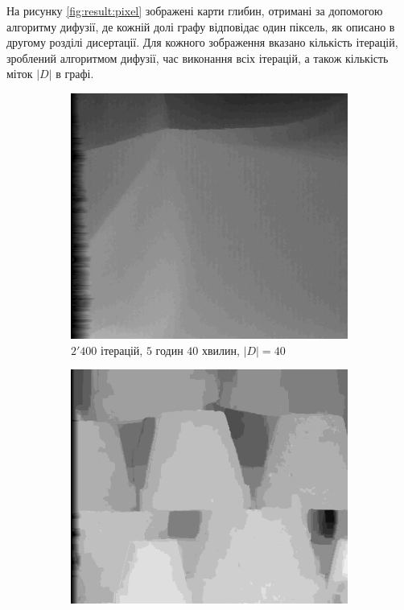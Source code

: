 На рисунку \ref{fig:result:pixel} зображені карти глибин,
отримані за допомогою алгоритму дифузії,
де кожній долі графу відповідає один піксель,
як описано в другому розділі дисертації.
Для кожного зображення вказано кількість ітерацій, зроблений алгоритмом дифузії,
час виконання всіх ітерацій, а також кількість міток $\left| D \right|$ в графі.

\begin{figure}[h]
\centering
    \begin{subfigure}[t]{0.32\textwidth}
        \centering
        \includegraphics[width=\textwidth]{images/cloth_pixel_based_stereo}
        \caption{$2'400$ ітерацій, $5$ годин $40$ хвилин, $\left| D \right| = 40$}
        \label{fig:cloth:pixel}
    \end{subfigure}
    \hfill
    \begin{subfigure}[t]{0.32\textwidth}
        \centering
        \includegraphics[width=\textwidth]{images/pots_pixel_based_stereo}

\end{subfigure}
\end{figure}
